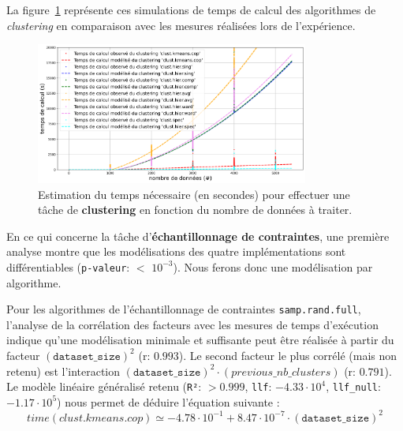 			La figure~\ref{figure:4.3.1-ETUDE-COUTS-TEMPS-CALCUL-MODELISATION-CLUSTERING} représente ces simulations de temps de calcul des algorithmes de \textit{clustering} en comparaison avec les mesures réalisées lors de l'expérience.
			\newline
			\begin{figure}[!htb]
				\centering
				\includegraphics[width=0.8\textwidth]{figures/etude-temps-calcul-modelisation-3clust}
				\caption{Estimation du temps nécessaire (en secondes) pour effectuer une tâche de \textbf{clustering} en fonction du nombre de données à traiter.}
				\label{figure:4.3.1-ETUDE-COUTS-TEMPS-CALCUL-MODELISATION-CLUSTERING}
			\end{figure}
			
			
			En ce qui concerne la tâche d'\textbf{échantillonnage de contraintes}, une première analyse montre que les modélisations des quatre implémentations sont différentiables  (\texttt{p-valeur}: $<$ \texttt{$10^{-3}$}). Nous ferons donc une modélisation par algorithme.
			
			Pour les algorithmes de l'échantillonnage de contraintes \texttt{samp.rand.full}, l'analyse de la corrélation des facteurs avec les mesures de temps d'exécution indique qu'une modélisation minimale et suffisante peut être réalisée à partir du facteur $(\texttt{dataset\_size})^{2}$ (r: $0.993$).
			Le second facteur le plus corrélé (mais non retenu) est l'interaction $(\texttt{dataset\_size})^{2}\cdot(previous\_nb\_clusters)$ (r: $0.791$).
			Le modèle linéaire généralisé retenu (\texttt{R²}: $> 0.999$, \texttt{llf}: $-4.33\cdot10^{4}$, \texttt{llf\_null}: $-1.17\cdot10^{5}$) nous permet de déduire l'équation suivante :
			\begin{equation}
				time(clust.kmeans.cop)
				\simeq -4.78\cdot10^{-1} + 8.47\cdot10^{-7}\cdot(\texttt{dataset\_size})^{2}
			\end{equation}
			
